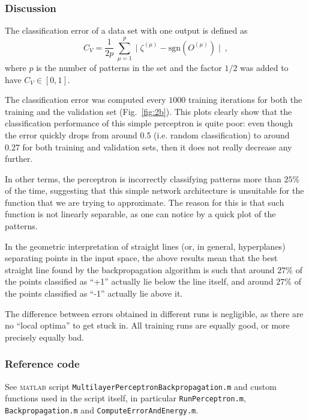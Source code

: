 \documentclass[12pt,titlepage]{article}
\begin{document}
\vspace*{-0.2cm}
\subsubsection*{Discussion}
\vspace*{-0.2cm}
The classification error of a data set with one output is defined as
\vspace*{-0.1cm}
\begin{equation}
C_V = \dfrac{1}{2p} \ \sum_{\mu = 1}^p \mid \zeta^{(\mu)} - \text{sgn}(O^{(\mu)}) \mid \ , 
\end{equation}
\vspace*{-0.2cm}
where $p$ is the number of patterns in the set and the factor $1/2$ was added to have $C_V \in [0,1]$.

The classification error was computed every $1000$ training iterations for both the training and the validation set (Fig.~\ref{fig:2b}). This plots clearly show that the classification performance of this simple perceptron is quite poor: even though the error quickly drops from around 0.5 (i.e. random classification) to around 0.27 for both training and validation sets, then it does not really decrease any further.

In other terms, the perceptron is incorrectly classifying patterns more than $25\%$ of the time, suggesting that this simple network architecture is unsuitable for the function that we are trying to approximate. The reason for this is that such function is not linearly separable, as one can notice by a quick plot of the patterns.

In the geometric interpretation of straight lines (or, in general, hyperplanes) separating points in the input space, the above results mean that the best straight line found by the backpropagation algorithm 
is such that around $27\%$ of the points classified as ``+1'' actually lie below the line itself, and around $27\%$ of the points classified as ``-1'' actually lie above it.

The difference between errors obtained in different runs is negligible, as there are no ``local optima'' to get stuck in. All training runs are equally good, or more precisely equally bad.

\vspace*{-0.2cm}
\subsubsection*{Reference code}
\vspace*{-0.2cm}
See \textsc{matlab} script \verb!MultilayerPerceptronBackpropagation.m! and custom functions used in the script itself, in particular \verb!RunPerceptron.m!, \verb!Backpropagation.m! and \verb!ComputeErrorAndEnergy.m!.
\end{document}
